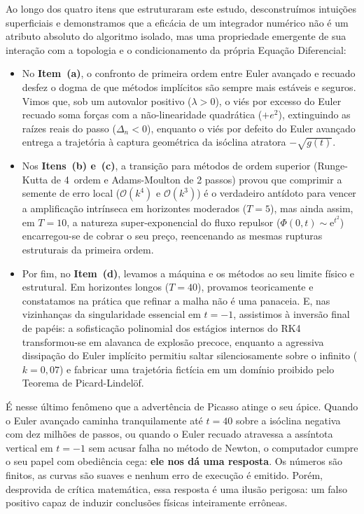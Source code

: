 \documentclass[12pt, a4paper]{article}
\begin{document}
Ao longo dos quatro itens que estruturaram este estudo, desconstruímos intuições superficiais e demonstramos que a eficácia de um integrador numérico não é um atributo absoluto do algoritmo isolado, mas uma propriedade emergente de sua interação com a topologia e o condicionamento da própria Equação Diferencial:
\begin{itemize}
    \item No \textbf{Item~(a)}, o confronto de primeira ordem entre Euler avançado e recuado desfez o dogma de que métodos implícitos são sempre mais estáveis e seguros. Vimos que, sob um autovalor positivo ($\lambda > 0$), o viés por excesso do Euler recuado soma forças com a não-linearidade quadrática ($+e^2$), extinguindo as raízes reais do passo ($\Delta_n < 0$), enquanto o viés por defeito do Euler avançado entrega a trajetória à captura geométrica da isóclina atratora $-\sqrt{g(t)}$.
    \item Nos \textbf{Itens~(b) e~(c)}, a transição para métodos de ordem superior (Runge-Kutta de 4\textordfeminine~ordem e Adams-Moulton de 2 passos) provou que comprimir a semente de erro local ($\mathcal{O}(k^4)$ e $\mathcal{O}(k^3)$) é o verdadeiro antídoto para vencer a amplificação intrínseca em horizontes moderados ($T = 5$), mas ainda assim, em $T = 10$, a natureza super-exponencial do fluxo repulsor ($\Phi(0, t) \sim \mathrm{e}^{t^2}$) encarregou-se de cobrar o seu preço, reencenando as mesmas rupturas estruturais da primeira ordem.
    \item Por fim, no \textbf{Item~(d)}, levamos a máquina e os métodos ao seu limite físico e estrutural. Em horizontes longos ($T = 40$), provamos teoricamente e constatamos na prática que refinar a malha não é uma panaceia. E, nas vizinhanças da singularidade essencial em $t = -1$, assistimos à inversão final de papéis: a sofisticação polinomial dos estágios internos do RK4 transformou-se em alavanca de explosão precoce, enquanto a agressiva dissipação do Euler implícito permitiu saltar silenciosamente sobre o infinito ($k = 0{,}07$) e fabricar uma trajetória fictícia em um domínio proibido pelo Teorema de Picard-Lindelöf.
\end{itemize}

É nesse último fenômeno que a advertência de Picasso atinge o seu ápice. Quando o Euler avançado caminha tranquilamente até $t = 40$ sobre a isóclina negativa com dez milhões de passos, ou quando o Euler recuado atravessa a assíntota vertical em $t = -1$ sem acusar falha no método de Newton, o computador cumpre o seu papel com obediência cega: \textbf{ele nos dá uma resposta}. Os números são finitos, as curvas são suaves e nenhum erro de execução é emitido. Porém, desprovida de crítica matemática, essa resposta é uma ilusão perigosa: um falso positivo capaz de induzir conclusões físicas inteiramente errôneas.
\end{document}
